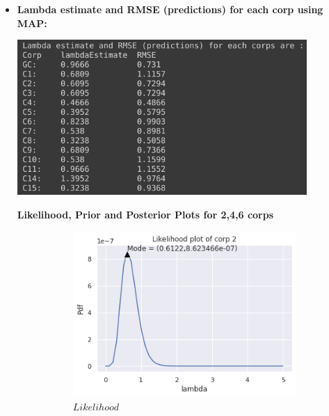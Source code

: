 \documentclass[english,a4paper,12pt]{article}
\begin{document}
\begin{enumerate}
\begin{itemize}
    \item \textbf{Lambda estimate and RMSE (predictions) for each corp using MAP:}
    
    \includegraphics[width=11cm]{pictures/Q3/Observations_Q3_3.png}
    
    \newpage
    \textbf{Likelihood, Prior and Posterior Plots for 2,4,6 corps}
   {\begin{figure} [h!]
     \centering
     \begin{subfigure}[b]{0.3\textwidth}
         \centering
         \includegraphics[width=\textwidth]{pictures/Q3/Likelhood_C2.png}
         \caption{$Likelihood$}
         \label{Likelihood}
     \end{subfigure}
     \hfill
     \begin{subfigure}[b]{0.3\textwidth}
         \centering

\end{subfigure}
\end{figure}}
\end{itemize}
\end{enumerate}
\end{document}
